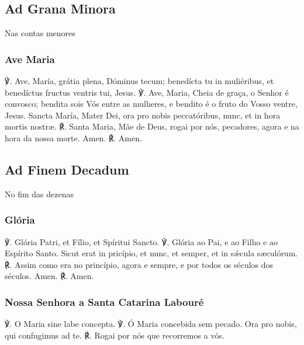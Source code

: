 \subsection{Ad Grana Minora}
\begin{nscenter}Nas contas menores\end{nscenter}
\subsubsection{Ave Maria}
\begin{paracol}{2}
{\redx ℣.} Ave, María, grátia plena, Dóminus tecum; benedícta tu in muliéribus, et benedíctus fructus ventris tui, Jesus.
\switchcolumn
{\redx ℣.} Ave, Maria, Cheia de graça, o Senhor é convosco; bendita sois Vós entre as mulheres, e bendito é o fruto do Vosso ventre, Jesus.
 Sancta María, Mater Dei, ora pro nobis peccatóribus, nunc, et in hora mortis nostræ.
\switchcolumn
{\redx ℟.} Santa Maria, Mãe de Deus, rogai por nós, pecadores, agora e na hora da nossa morte.
 Amen.
\switchcolumn
{\redx ℟.} Amen.
\end{paracol}

\subsection{Ad Finem Decadum}
\begin{nscenter}No fim das dezenas\end{nscenter}
\subsubsection{Glória}
\begin{paracol}{2}
{\redx ℣.} Glória Patri, et Fílio, et Spíritui Sancto.
\switchcolumn
{\redx ℣.} Glória ao Pai, e ao Filho e ao Espírito Santo.
 Sicut erat in pricípio, et nunc, et semper, et in sǽcula sæculórum.
\switchcolumn
{\redx ℟.} Assim como era no princípio, agora e sempre, e por todos os séculos dos
séculos.
 Amen.
\switchcolumn
{\redx ℟.} Amen.
\end{paracol}

\subsubsection{Nossa Senhora a Santa Catarina Labouré}
\begin{paracol}{2}
{\redx ℣.} O Maria sine labe concepta.
\switchcolumn
{\redx ℣.} Ó Maria concebida sem pecado.
 Ora pro nobis, qui confugimus ad te.
\switchcolumn
{\redx ℟.} Rogai por nós que recorremos a vós.
\end{paracol}

